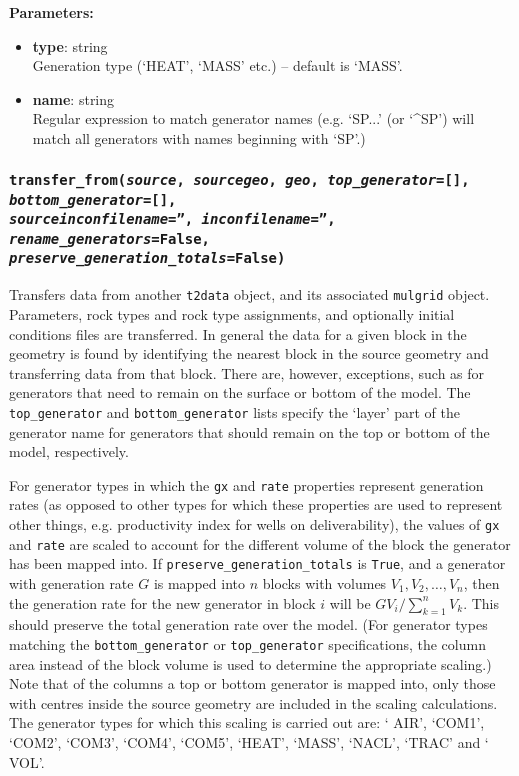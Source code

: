 \textbf{Parameters:}
\begin{itemize}
\item \textbf{type}: string\\
  Generation type (`HEAT', `MASS' etc.) -- default is `MASS'.
\item \textbf{name}: string\\
  Regular expression to match generator names (e.g. `SP...' (or `\^{}SP') will match all generators with names beginning with `SP'.)
\end{itemize}

\begin{snugshade}
\subsubsection{\texttt{transfer\_from(\emph{source}, \emph{sourcegeo}, \emph{geo}, \emph{top\_generator}=[], \emph{bottom\_generator}=[],\\
    \emph{sourceinconfilename}='', \emph{inconfilename}='', \emph{rename\_generators}=False, \\
    \emph{preserve\_generation\_totals}=False)}}
\end{snugshade}
\label{sec:t2data:transfer_from}

Transfers data from another \texttt{t2data} object, and its associated \texttt{mulgrid} object.  Parameters, rock types and rock type assignments, and optionally initial conditions files are transferred.  In general the data for a given block in the geometry is found by identifying the nearest block in the source geometry and transferring data from that block.  There are, however, exceptions, such as for generators that need to remain on the surface or bottom of the model.  The \texttt{top\_generator} and \texttt{bottom\_generator} lists specify the `layer' part of the generator name for generators that should remain on the top or bottom of the model, respectively.

For generator types in which the \texttt{gx} and \texttt{rate} properties represent generation rates (as opposed to other types for which these properties are used to represent other things, e.g. productivity index for wells on deliverability), the values of \texttt{gx} and \texttt{rate} are scaled to account for the different volume of the block the generator has been mapped into.  If \texttt{preserve\_generation\_totals} is \texttt{True}, and a generator with generation rate $G$ is mapped into $n$ blocks with volumes $V_1, V_2,\ldots, V_n$, then the generation rate for the new generator in block $i$ will be $G V_i/\sum_{k=1}^{n}{V_k}$.  This should preserve the total generation rate over the model.  (For generator types matching the \texttt{bottom\_generator} or \texttt{top\_generator} specifications, the column area instead of the block volume is used to determine the appropriate scaling.)  Note that of the columns a top or bottom generator is mapped into, only those with centres inside the source geometry are included in the scaling calculations.  The generator types for which this scaling is carried out are: ` AIR', `COM1', `COM2', `COM3', `COM4', `COM5', `HEAT', `MASS', `NACL', `TRAC'  and ` VOL'.

